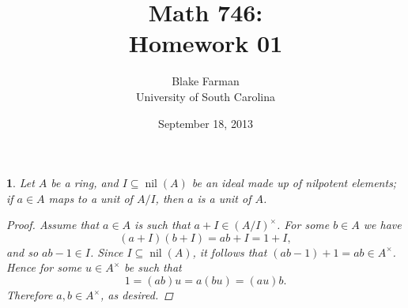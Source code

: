 \documentclass[10pt]{amsart}
\author{Blake Farman\\University of South Carolina}
\title{Math 746:\\Homework 01}
\date{September 18, 2013}
\begin{document}
\maketitle

\providecommand{\p}{\mathfrak{p}}
\providecommand{\m}{\mathfrak{m}}

\newtheorem{thm}{}
\newtheorem{lem}{Lemma}
\newtheorem{prop}{Proposition}
\theoremstyle{definition}
\newtheorem{defn}{Definition}

\newcommand{\A}{\mathbb{A}}
\newcommand{\nil}[1]{\operatorname{nil}{\left(#1\right)}}

\begin{thm}
  Let $A$ be a ring, and $I \subseteq \nil{A}$ be an ideal made up of nilpotent elements; if $a \in A$ maps to a unit of $A / I$, then $a$ is a unit of $A$.

  \begin{proof}
    Assume that $a \in A$ is such that $a + I \in (A/I)^\times$.
    For some $b \in A$ we have
    $$(a + I)(b + I) = ab + I = 1 + I,$$
    and so $ab - 1 \in I$.
    Since $I \subseteq \nil{A}$, it follows that $(ab - 1) + 1 = ab \in A^\times$.
    Hence for some $u \in A^\times$ be such that
    $$1 = (ab)u = a(bu) = (au)b.$$
    Therefore  $a, b \in A^\times$, as desired.
  \end{proof}
\end{thm}
\end{document}
